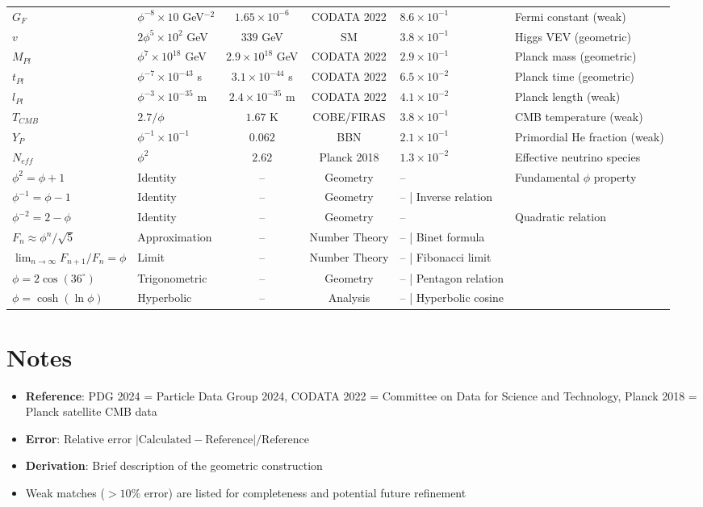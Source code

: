 \begin{longtable}{p{3.5cm}p{4cm}ccp{2cm}p{3cm}}
$G_F$ & $\phi^{-8}\times10$ GeV$^{-2}$ & $1.65\times10^{-6}$ & CODATA 2022 & $8.6\times10^{-1}$ & Fermi constant (weak) \\
$v$ & $2\phi^5\times10^2$ GeV & $339$ GeV & SM & $3.8\times10^{-1}$ & Higgs VEV (geometric) \\
$M_{Pl}$ & $\phi^7\times10^{18}$ GeV & $2.9\times10^{18}$ GeV & CODATA 2022 & $2.9\times10^{-1}$ & Planck mass (geometric) \\
$t_{Pl}$ & $\phi^{-7}\times10^{-43}$ s & $3.1\times10^{-44}$ s & CODATA 2022 & $6.5\times10^{-2}$ & Planck time (geometric) \\
$l_{Pl}$ & $\phi^{-3}\times10^{-35}$ m & $2.4\times10^{-35}$ m & CODATA 2022 & $4.1\times10^{-2}$ & Planck length (weak) \\
$T_{CMB}$ & $2.7/\phi$ & $1.67$ K & COBE/FIRAS & $3.8\times10^{-1}$ & CMB temperature (weak) \\
$Y_P$ & $\phi^{-1}\times10^{-1}$ & $0.062$ & BBN & $2.1\times10^{-1}$ & Primordial He fraction (weak) \\
$N_{eff}$ & $\phi^2$ & $2.62$ & Planck 2018 & $1.3\times10^{-2}$ & Effective neutrino species \\

$\phi^2 = \phi + 1$ & Identity & -- & Geometry & -- & Fundamental $\phi$ property \\
$\phi^{-1} = \phi - 1$ & Identity & -- & Geometry & -- | Inverse relation \\
$\phi^{-2} = 2 - \phi$ & Identity & -- & Geometry & -- & Quadratic relation \\
$F_n \approx \phi^n/\sqrt{5}$ & Approximation & -- & Number Theory & -- | Binet formula \\
$\lim_{n\to\infty} F_{n+1}/F_n = \phi$ & Limit & -- & Number Theory & -- | Fibonacci limit \\
$\phi = 2\cos(36^\circ)$ & Trigonometric & -- & Geometry & -- | Pentagon relation \\
$\phi = \cosh(\ln\phi)$ & Hyperbolic & -- & Analysis & -- | Hyperbolic cosine \\

\hline
\end{longtable}

\section{Notes}

\begin{itemize}
    \item \textbf{Reference}: PDG 2024 = Particle Data Group 2024, CODATA 2022 = Committee on Data for Science and Technology, Planck 2018 = Planck satellite CMB data
    \item \textbf{Error}: Relative error $| \text{Calculated} - \text{Reference} | / \text{Reference}$
    \item \textbf{Derivation}: Brief description of the geometric construction
    \item Weak matches ($>10\%$ error) are listed for completeness and potential future refinement
\end{itemize}

